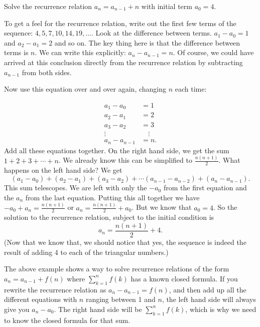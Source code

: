 \documentclass[12pt]{article}
\begin{document}
\begin{example}
  Solve the recurrence relation $a_n = a_{n-1} + n$ with initial term $a_0 = 4$.  
  
  \begin{solution}
    To get a feel for the recurrence relation, write out the first few terms of the sequence: $4, 5, 7, 10, 14, 19, \ldots$.  Look at the difference between terms.  $a_1 - a_0 = 1$ and $a_2 - a_1 = 2$ and so on.  The key thing here is that the difference between terms is $n$.  We can write this explicitly: $a_n - a_{n-1} = n$.  Of course, we could have arrived at this conclusion directly from the recurrence relation by subtracting $a_{n-1}$ from both sides.
    
    Now use this equation over and over again, changing $n$ each time:
    
    \begin{align*}
      a_1 - a_0 &= 1\\
      a_2 - a_1 &= 2\\
      a_3 - a_2 & = 3\\
      \vdots \quad & \quad \vdots \\
      a_n - a_{n-1} & = n.
    \end{align*}
  Add all these equations together.  On the right hand side, we get the sum $1 + 2 + 3 + \cdots + n$.  We already know this can be simplified to $\frac{n(n+1)}{2}$.  What happens on the left hand side?  We get 
  \[(a_1 - a_0) + (a_2 - a_1) + (a_3 - a_2) + \cdots (a_{n-1} - a_{n-2})+ (a_n - a_{n-1}).\]
  This sum telescopes.  We are left with only the $-a_0$ from the first equation and the $a_n$ from the last equation.  Putting this all together we have $-a_0 + a_n = \frac{n(n+1)}{2}$ or $a_n = \frac{n(n+1)}{2} + a_0$.  But we know that $a_0 = 4$.  So the solution to the recurrence relation, subject to the initial condition is
  \[a_n = \frac{n(n+1)}{2} + 4.\]
  (Now that we know that, we should notice that yes, the sequence is indeed the result of adding 4 to each of the triangular numbers.)
  \end{solution}

\end{example}

The above example shows a way to solve recurrence relations of the form $a_n = a_{n-1} + f(n)$ where $\sum_{k = 1}^n f(k)$ has a known closed formula.  If you rewrite the recurrence relation as $a_n - a_{n-1} = f(n)$, and then add up all the different equations with $n$ ranging between 1 and $n$, the left hand side will always give you $a_n - a_0$.  The right hand side will be $\sum_{k = 1}^n f(k)$, which is why we need to know the closed formula for that sum.
\end{document}
